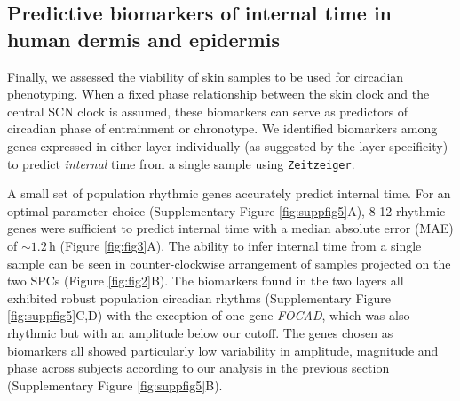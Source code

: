 
\subsection*{Predictive biomarkers of internal time in human dermis and epidermis}
Finally, we assessed the viability of skin samples to be used for circadian phenotyping. When a fixed phase relationship between the skin clock and the central SCN clock is assumed, these biomarkers can serve as predictors of circadian phase of entrainment or chronotype. We identified biomarkers among genes expressed in either layer individually (as suggested by the layer-specificity) to predict \textit{internal} time from a single sample using \texttt{Zeitzeiger}.

A small set of population rhythmic genes accurately predict internal time. For an optimal parameter choice (Supplementary Figure \ref{fig:suppfig5}A), 8-12 rhythmic genes were sufficient to predict internal time with a median absolute error (MAE) of $\sim 1.2$\,h (Figure \ref{fig:fig3}A). The ability to infer internal time from a single sample can be seen in counter-clockwise arrangement of samples projected on the two SPCs (Figure \ref{fig:fig2}B). The biomarkers found in the two layers all exhibited robust population circadian rhythms (Supplementary Figure \ref{fig:suppfig5}C,D) with the exception of one gene \textit{FOCAD}, which was also rhythmic but with an amplitude below our cutoff. The genes chosen as biomarkers all showed particularly low variability in amplitude, magnitude and phase across subjects according to our analysis in the previous section (Supplementary Figure \ref{fig:suppfig5}B).

